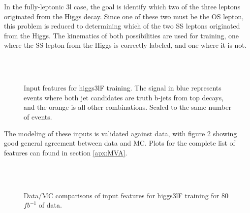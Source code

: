 In the fully-leptonic 3l case, the goal is identify which two of the three leptons originated from the Higgs decay. Since one of these two must be the OS lepton, this problem is reduced to determining which of the two SS leptons originated from the Higgs. The kinematics of both possibilities are used for training, one where the SS lepton from the Higgs is correctly labeled, and one where it is not.



\begin{figure}[h!]
    \\
    \\
    \caption{Input features for higgs3lF training. The signal in blue represents events where both jet candidates are truth b-jets from top decays, and the orange is all other combinations. Scaled to the same number of events.}
    \label{fig:features_higgs3lF}
\end{figure}

The modeling of these inputs is validated against data, with figure \ref{fig:model_higgs3lF} showing good general agreement between data and MC. Plots for the complete list of features can found in section \ref{apx:MVA}.

\begin{figure}[h!]
    \\
    \\
    \caption{Data/MC comparisons of input features for higgs3lF training for 80 $fb^{-1}$ of data.}
    \label{fig:model_higgs3lF}
\end{figure} 

